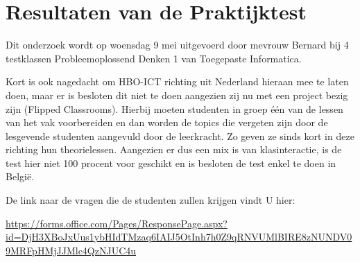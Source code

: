 
\chapter{Resultaten van de Praktijktest}
\label{ch:resultaten_praktijk}

Dit onderzoek wordt op woensdag 9 mei uitgevoerd door mevrouw Bernard bij 4 testklassen Probleemoplossend Denken 1 van Toegepaste Informatica.

Kort is ook nagedacht om HBO-ICT richting uit Nederland hieraan mee te laten doen, maar er is besloten dit niet te doen aangezien zij nu met een project bezig zijn (Flipped Classrooms). Hierbij moeten studenten in groep één van de lessen van het vak voorbereiden en dan worden de topics die vergeten zijn door de lesgevende studenten aangevuld door de leerkracht. Zo geven ze sinds kort in deze richting hun theorielessen. Aangezien er dus een mix is van klasinteractie, is de test hier niet 100 procent voor geschikt en is besloten de test enkel te doen in België.

De link naar de vragen die de studenten zullen krijgen vindt U hier:

\url{https://forms.office.com/Pages/ResponsePage.aspx?id=DjH3XBoJxUus1ybHIdTMzaq6IAIJ5OtInh7h0Z9qRNVUMlBIRE8zNUNDV09MRFpHMjJJMlc4QzNJUC4u}



